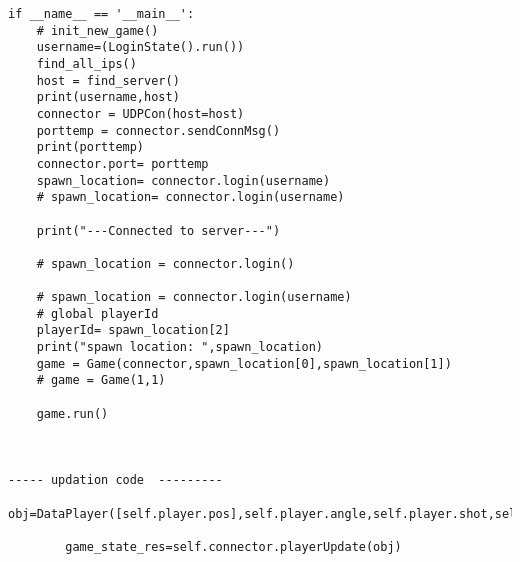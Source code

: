         \begin{lstlisting}[style=pythonstyle, caption=client code]
            if __name__ == '__main__':
    # init_new_game()
    username=(LoginState().run())
    find_all_ips()
    host = find_server()
    print(username,host)
    connector = UDPCon(host=host)
    porttemp = connector.sendConnMsg()
    print(porttemp)
    connector.port= porttemp
    spawn_location= connector.login(username)
    # spawn_location= connector.login(username)

    print("---Connected to server---")

    # spawn_location = connector.login()
    
    # spawn_location = connector.login(username)
    # global playerId 
    playerId= spawn_location[2]
    print("spawn location: ",spawn_location)
    game = Game(connector,spawn_location[0],spawn_location[1])
    # game = Game(1,1)

    game.run()



----- updation code  ---------
    obj=DataPlayer([self.player.pos],self.player.angle,self.player.shot,self.player.health,self.player.shotWho)
    
        game_state_res=self.connector.playerUpdate(obj)
            \end{lstlisting}

